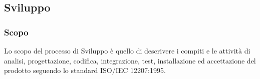 \subsection{Sviluppo}
\subsubsection{Scopo}
Lo scopo del processo di Sviluppo è quello di descrivere i compiti e le attività di analisi, progettazione, codifica, integrazione, test, installazione ed accettazione del prodotto seguendo lo standard ISO/IEC 12207:1995.


